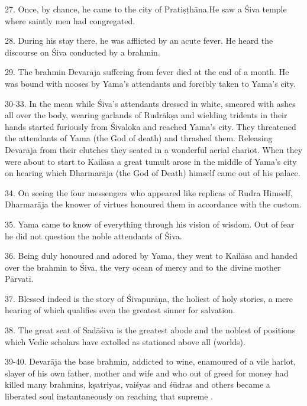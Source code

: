 27. Once, by chance, he came to the city of Pratiṣṭhāna.He saw a Śiva temple
where saintly men had congregated.

28. During his stay there, he was afflicted by an acute fever. He heard
the discourse on Śiva conducted by a brahmin.

29. The brahmin Devarāja suffering from fever died at the end of a month. He was
bound with nooses by Yama’s attendants and forcibly taken to Yama’s city.

30-33. In the mean while Śiva’s attendants dressed in white, smeared with ashes
all over the body, wearing garlands of Rudrākṣa and wielding tridents in their
hands started furiously from Śivaloka and reached Yama’s city. They threatened
the attendants of Yama (the God of death) and thrashed them. Releasing Devarāja
from their clutches they seated in a wonderful aerial chariot. When they were
about to start to Kailāsa a great tumult arose in the middle of Yama’s city on
hearing which Dharmarāja (the God of Death) himself came out of his palace.

34. On seeing the four messengers who appeared like replicas of Rudra Himself,
Dharmarāja the knower of virtues honoured them in accordance with the custom.

35. Yama came to know of everything through his vision of wisdom. Out of fear he
did not question the noble attendants of Śiva.

36. Being duly honoured and adored by Yama, they went to Kailāsa and handed over
the brahmin to Śiva, the very ocean of mercy and to the divine mother Pārvatī.

37. Blessed indeed is the story of Śivapurāṇa, the holiest of holy stories,
a mere hearing of which qualifies even the greatest sinner for salvation.

38. The great seat of Sadāśiva is the greatest abode and the noblest of
positions which Vedic scholars have extolled as stationed above all 
(worlds).

39-40. Devarāja the base brahmin, addicted to wine, enamoured of a vile harlot,
slayer of his own father, mother and wife and who out of greed for money had
killed many brahmins, kṣatriyas, vaiśyas and śūdras and others became a
liberated soul instantaneously on reaching that supreme .
